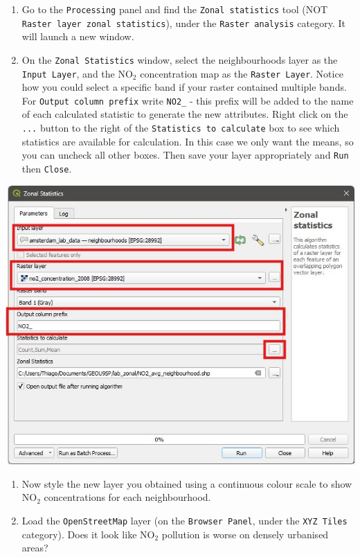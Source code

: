 \documentclass[
  letterpaper,
  DIV=11,
  numbers=noendperiod]{scrreprt}
\begin{document}
\begin{enumerate}
\def\labelenumi{(\arabic{enumi})}
\setcounter{enumi}{319}
\item
  Go to the \texttt{Processing} panel and find the
  \texttt{Zonal\ statistics} tool (NOT
  \texttt{Raster\ layer\ zonal\ statistics}), under the
  \texttt{Raster\ analysis} category. It will launch a new window.
\item
  On the \texttt{Zonal\ Statistics} window, select the neighbourhoods
  layer as the \texttt{Input\ Layer}, and the NO\(_2\) concentration map
  as the \texttt{Raster\ Layer}. Notice how you could select a specific
  band if your raster contained multiple bands. For
  \texttt{Output\ column\ prefix} write \texttt{NO2\_} - this prefix
  will be added to the name of each calculated statistic to generate the
  new attributes. Right click on the \texttt{...} button to the right of
  the \texttt{Statistics\ to\ calculate} box to see which statistics are
  available for calculation. In this case we only want the means, so you
  can uncheck all other boxes. Then save your layer appropriately and
  \texttt{Run} then \texttt{Close}.
\end{enumerate}

\includegraphics{images/lab_12/lab12_fig1_zonastats.jpg}

\begin{enumerate}
\def\labelenumi{(\arabic{enumi})}
\setcounter{enumi}{321}
\item
  Now style the new layer you obtained using a continuous colour scale
  to show NO\(_2\) concentrations for each neighbourhood.
\item
  Load the \texttt{OpenStreetMap} layer (on the \texttt{Browser\ Panel},
  under the \texttt{XYZ\ Tiles} category). Does it look like NO\(_2\)
  pollution is worse on densely urbanised areas?
\end{enumerate}
\end{document}
